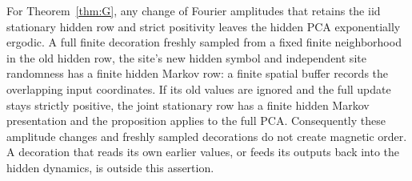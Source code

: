 For Theorem~\ref{thm:G}, any change of Fourier amplitudes that retains the iid stationary hidden row and strict positivity leaves the hidden PCA exponentially ergodic. A full finite decoration freshly sampled from a fixed finite neighborhood in the old hidden row, the site's new hidden symbol and independent site randomness has a finite hidden Markov row: a finite spatial buffer records the overlapping input coordinates. If its old values are ignored and the full update stays strictly positive, the joint stationary row has a finite hidden Markov presentation and the proposition applies to the full PCA. Consequently these amplitude changes and freshly sampled decorations do not create magnetic order. A decoration that reads its own earlier values, or feeds its outputs back into the hidden dynamics, is outside this assertion.

